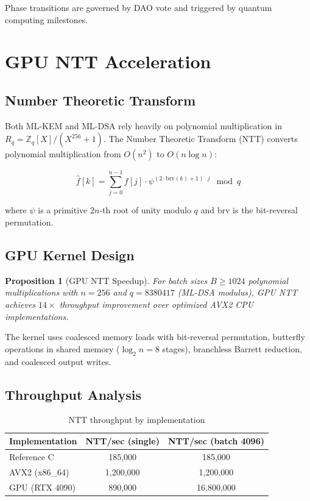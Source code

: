 \documentclass[11pt,letterpaper]{article}
\newtheorem{proposition}[theorem]{Proposition}
\theoremstyle{definition}
\theoremstyle{remark}
\begin{document}
Phase transitions are governed by DAO vote and triggered by quantum computing milestones.

\section{GPU NTT Acceleration}

\subsection{Number Theoretic Transform}

Both ML-KEM and ML-DSA rely heavily on polynomial multiplication in $R_q = \mathbb{Z}_q[X]/(X^{256} + 1)$. The Number Theoretic Transform (NTT) converts polynomial multiplication from $O(n^2)$ to $O(n \log n)$:

\begin{equation}
\hat{f}[k] = \sum_{j=0}^{n-1} f[j] \cdot \psi^{(2 \cdot \text{brv}(k) + 1) \cdot j} \mod q
\end{equation}

where $\psi$ is a primitive $2n$-th root of unity modulo $q$ and $\text{brv}$ is the bit-reversal permutation.

\subsection{GPU Kernel Design}

\begin{proposition}[GPU NTT Speedup]
For batch sizes $B \geq 1024$ polynomial multiplications with $n = 256$ and $q = 8380417$ (ML-DSA modulus), GPU NTT achieves $14\times$ throughput improvement over optimized AVX2 CPU implementations.
\end{proposition}

The kernel uses coalesced memory loads with bit-reversal permutation, butterfly operations in shared memory ($\log_2 n = 8$ stages), branchless Barrett reduction, and coalesced output writes.

\subsection{Throughput Analysis}

\begin{table}[h]
\centering
\begin{tabular}{lcc}
\toprule
\textbf{Implementation} & \textbf{NTT/sec (single)} & \textbf{NTT/sec (batch 4096)} \\
\midrule
Reference C & 185,000 & 185,000 \\
AVX2 (x86\_64) & 1,200,000 & 1,200,000 \\
GPU (RTX 4090) & 890,000 & 16,800,000 \\
\bottomrule
\end{tabular}
\caption{NTT throughput by implementation}
\label{tab:ntt-throughput}
\end{table}
\end{document}
